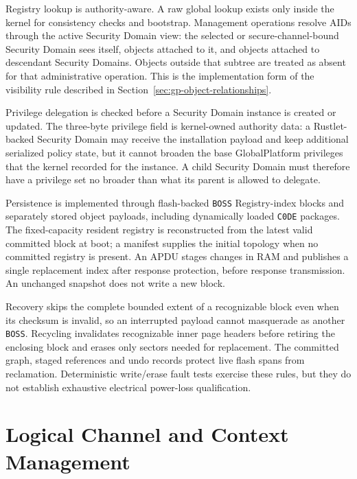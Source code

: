 Registry lookup is authority-aware. A raw global lookup exists only inside the
kernel for consistency checks and bootstrap. Management operations resolve AIDs
through the active Security Domain view: the selected or secure-channel-bound
Security Domain sees itself, objects attached to it, and objects attached to
descendant Security Domains. Objects outside that subtree are treated as absent
for that administrative operation. This is the implementation form of the
visibility rule described in Section~\ref{sec:gp-object-relationships}.

Privilege delegation is checked before a Security Domain instance is created or
updated. The three-byte privilege field is kernel-owned authority data: a
Rustlet-backed Security Domain may receive the installation payload and keep
additional serialized policy state, but it cannot broaden the base
GlobalPlatform privileges that the kernel recorded for the instance. A child
Security Domain must therefore have a privilege set no broader than what its
parent is allowed to delegate.

Persistence is implemented through flash-backed \texttt{BOSS} Registry-index
blocks and separately stored object payloads, including dynamically loaded
\texttt{C0DE} packages. The fixed-capacity resident registry is reconstructed
from the latest valid committed block at boot; a manifest supplies the initial
topology when no committed registry is present. An APDU stages changes in RAM
and publishes a single replacement index after response protection, before
response transmission. An unchanged snapshot does not write a new block.

Recovery skips the complete bounded extent of a recognizable block even when
its checksum is invalid, so an interrupted payload cannot masquerade as
another \texttt{BOSS}. Recycling invalidates recognizable inner page headers
before retiring the enclosing block and erases only sectors needed for
replacement. The committed graph, staged references and undo records protect
live flash spans from reclamation. Deterministic write/erase fault tests
exercise these rules, but they do not establish exhaustive electrical
power-loss qualification.

\section{Logical Channel and Context Management}
\label{sec:impl-channel}

